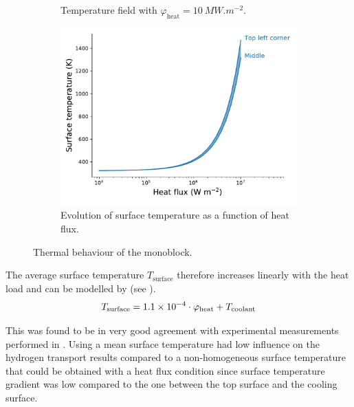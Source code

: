 \begin{figure} [h!]
\begin{subfigure}{0.4\linewidth}
        \caption{Temperature field with $\varphi_\mathrm{heat} = \SI{10}{MW.m^{-2}}$.}
    \end{subfigure}
    \begin{subfigure}{0.7\linewidth}
        \centering
        \includegraphics[width=\linewidth]{Figures/Chapter3/monoblocks/parametric_study/temperature_phi_H.pdf}
        \caption{Evolution of surface temperature as a function of heat flux.}
    \end{subfigure}
    \caption{Thermal behaviour of the monoblock.}
\end{figure}

The average surface temperature $T_\mathrm{surface}$ therefore increases linearly with the heat load and can be modelled by  (see ).
\begin{equation}
    T_\mathrm{surface} = 1.1 \times 10^{-4} \cdot \varphi_\mathrm{heat} + T_\mathrm{coolant}
    \labeq{thermal behaviour law}
\end{equation}

This was found to be in very good agreement with experimental measurements performed in .
Using a mean surface temperature had low influence on the hydrogen transport results compared to a non-homogeneous surface temperature that could be obtained with a heat flux condition since surface temperature gradient was low compared to the one between the top surface and the cooling surface.

